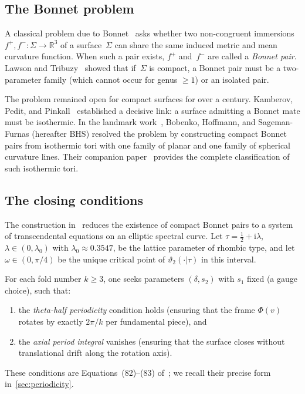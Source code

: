 \documentclass[11pt,a4paper]{article}
\theoremstyle{plain}
\theoremstyle{definition}
\theoremstyle{remark}
\newcommand{\vt}[1]{\vartheta_{#1}}     %
\newcommand{\RR}{\mathbb{R}}
\newcommand{\ii}{\mathrm{i}}
\begin{document}
\subsection{The Bonnet problem}
A classical problem due to Bonnet~\cite{Bon67} asks whether two
non-congruent immersions $f^+, f^- \colon \Sigma \to \RR^3$ of a
surface~$\Sigma$ can share the same induced metric and mean curvature
function.  When such a pair exists, $f^+$ and~$f^-$ are called a
\emph{Bonnet pair}.  Lawson and Tribuzy~\cite{LT81} showed that
if~$\Sigma$ is compact, a Bonnet pair must be a two-parameter family
(which cannot occur for genus $\geq 1$) or an isolated pair.

The problem remained open for compact surfaces for over a century.
Kamberov, Pedit, and Pinkall~\cite{KPP98} established a decisive link:
a surface admitting a Bonnet mate must be isothermic.  In the landmark
work~\cite{BHS25}, Bobenko, Hoffmann, and Sageman-Furnas (hereafter
BHS) resolved the problem by constructing compact Bonnet pairs
from isothermic tori with one family of planar and one family of
spherical curvature lines.  Their companion paper~\cite{BHS-comp}
provides the complete classification of such isothermic tori.

\subsection{The closing conditions}
The construction in~\cite{BHS25} reduces the existence of compact
Bonnet pairs to a system of transcendental equations on an elliptic
spectral curve.  Let $\tau = \tfrac{1}{2} + \ii\lambda$,
$\lambda \in (0,\lambda_0)$ with $\lambda_0 \approx 0.3547$, be the
lattice parameter of rhombic type, and let $\omega \in (0,\pi/4)$ be
the unique critical point of $\vt{2}(\cdot|\tau)$ in this interval.

For each fold number $k \geq 3$, one seeks parameters $(\delta, s_2)$
with $s_1$ fixed (a gauge choice), such that:
\begin{enumerate}[label=(\roman*),nosep]
\item the \emph{theta-half periodicity} condition holds
  (ensuring that the frame $\Phi(v)$ rotates by exactly $2\pi/k$ per
  fundamental piece), and
\item the \emph{axial period integral} vanishes
  (ensuring that the surface closes without translational drift
  along the rotation axis).
\end{enumerate}
These conditions are Equations~(82)--(83) of~\cite{BHS-comp}; we
recall their precise form in~\cref{sec:periodicity}.
\end{document}
